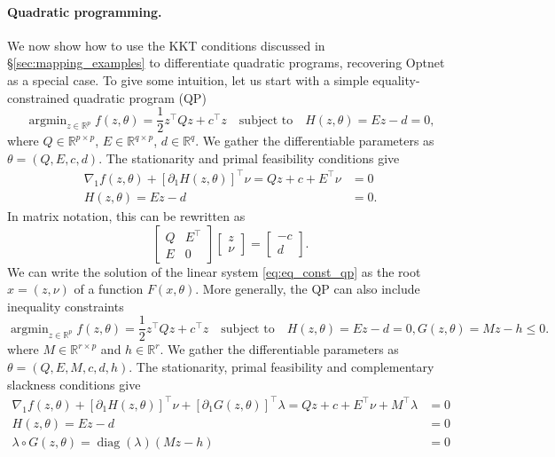 \documentclass{article}
\def\RR{{\mathbb R}}
\DeclareMathOperator*{\argmin}{argmin}
\DeclareMathOperator*{\diag}{diag}
\begin{document}
\paragraph{Quadratic programming.}

We now show how to use the KKT conditions discussed in
\S\ref{sec:mapping_examples} to differentiate quadratic programs,
recovering Optnet \cite{amos_2017} as a special case.  To give some
intuition, let us start with a simple equality-constrained quadratic program
(QP)
\begin{equation}
\argmin_{z \in \RR^p} 
f(z, \theta) = \frac{1}{2} z^\top Q z + c^\top z
\quad \text{subject to} \quad
H(z, \theta) = E z - d = 0,
\end{equation}
where $Q \in \RR^{p \times p}$, $E \in \RR^{q \times p}$,
$d \in \RR^q$. 
We gather the differentiable parameters as $\theta = (Q, E, c, d)$.
The stationarity and primal feasibility conditions give
\begin{align}
\nabla_1 f(z, \theta) + [\partial_1 H(z, \theta)]^\top \nu
= Q z + c + E^\top \nu &= 0 \\
H(z, \theta) = E z - d &= 0.
\end{align}
In matrix notation, this can be rewritten as
\begin{equation}
\begin{bmatrix}
   Q & E^\top \\
   E & 0
\end{bmatrix}
\begin{bmatrix} 
z \\ 
\nu 
\end{bmatrix}
=
\begin{bmatrix} 
-c \\ 
d
\end{bmatrix}.
\label{eq:eq_const_qp}
\end{equation}
We can write the solution of the linear system
\eqref{eq:eq_const_qp} as the root $x = (z, \nu)$ of a function $F(x,
\theta)$. More generally, the QP can also include inequality constraints
\begin{equation}
\argmin_{z \in \RR^p} 
f(z, \theta) = \frac{1}{2} z^\top Q z + c^\top z
\quad \text{subject to} \quad
H(z, \theta) = E z - d = 0, 
G(z, \theta) = M z - h \le 0.
\label{eq:qp_eq_ineq}
\end{equation}
where $M \in \RR^{r \times p}$ and $h \in \RR^r$.
We gather the differentiable parameters as $\theta = (Q, E, M, c, d, h)$.
The stationarity, primal feasibility and complementary slackness conditions give
\begin{align}
\nabla_1 f(z, \theta) + [\partial_1 H(z, \theta)]^\top \nu
+ [\partial_1 G(z, \theta)]^\top \lambda =
Q z + c + E^\top \nu + M^\top \lambda &= 0 \\
H(z, \theta) = E z - d &= 0 \\
\lambda \circ G(z, \theta) = \diag(\lambda)(Mz-h) &= 0
\end{align}
\end{document}
